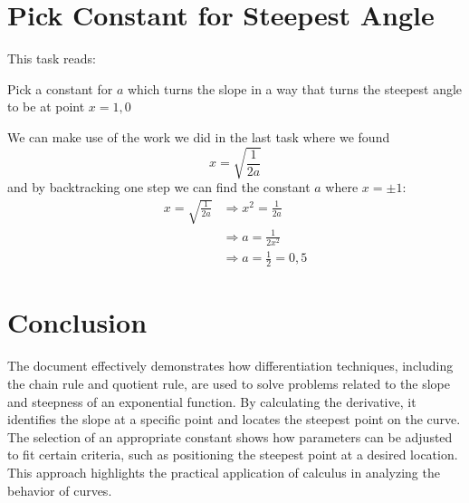 \documentclass[a4paper,12pt]{article}
\begin{document}
\section{Pick Constant for Steepest Angle}
\label{sec:uppgN}
This task reads:\\ %
\begin{addmargin}[1em]{1em}
    Pick a constant for $a$ which turns the slope in a way that %
    turns the steepest angle to be at point $x = 1,0$
\end{addmargin}
We can make use of the work we did in the last task where we found
\begin{displaymath}
    x = \sqrt{\frac{1}{2a}} %
\end{displaymath}
and by backtracking one step we can find the constant $a$ where $x = \pm 1$:
\begin{equation}
    \begin{split} %
        x = \sqrt{\frac{1}{2a}} &\Rightarrow x^2 = \frac{1}{2a} \\%
                                &\Rightarrow a = \frac{1}{2x^2} \\%
                                &\Rightarrow a = \frac{1}{2} = 0,5
    \end{split}
\end{equation}
%
\section{Conclusion}
\label{sec:disk}
The document effectively demonstrates how differentiation techniques, 
including the chain rule and quotient rule, are used to solve problems 
related to the slope and steepness of an exponential function. 
By calculating the derivative, it identifies the slope 
at a specific point and locates the steepest point on the curve. 
The selection of an appropriate constant shows how parameters can be 
adjusted to fit certain criteria, such as positioning the steepest 
point at a desired location. This approach highlights the practical 
application of calculus in analyzing the behavior of curves.
%
\end{document}
